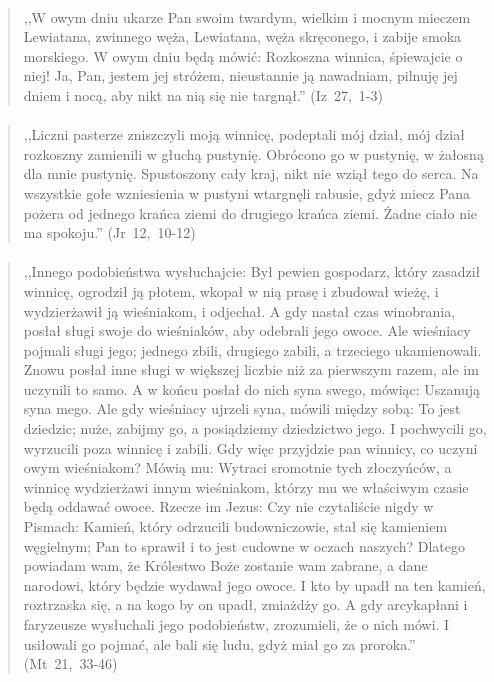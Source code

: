 \documentclass[10pt,a4paper,oneside]{article}
\begin{document}
\paragraph{}
\begin{quote}
,,W owym dniu ukarze Pan swoim twardym, wielkim i mocnym mieczem Lewiatana, zwinnego węża, Lewiatana, węża skręconego, i zabije smoka morskiego. W owym dniu będą mówić: Rozkoszna winnica, śpiewajcie o niej! Ja, Pan, jestem jej stróżem, nieustannie ją nawadniam, pilnuję jej dniem i nocą, aby nikt na nią się nie targnął.'' \mbox{(Iz 27, 1-3)}
\end{quote}
\paragraph{}
\begin{quote}
,,Liczni pasterze zniszczyli moją winnicę, podeptali mój dział, mój dział rozkoszny zamienili w głuchą pustynię. Obrócono go w pustynię, w żałosną dla mnie pustynię. Spustoszony cały kraj, nikt nie wziął tego do serca. Na wszystkie gołe wzniesienia w pustyni wtargnęli rabusie, gdyż miecz Pana pożera od jednego krańca ziemi do drugiego krańca ziemi. Żadne ciało nie ma spokoju.'' \mbox{(Jr 12, 10-12)}
\end{quote}
\paragraph{}
\begin{quote}
,,Innego podobieństwa wysłuchajcie: Był pewien gospodarz, który zasadził winnicę, ogrodził ją płotem, wkopał w nią prasę i zbudował wieżę, i wydzierżawił ją wieśniakom, i odjechał. A gdy nastał czas winobrania, posłał sługi swoje do wieśniaków, aby odebrali jego owoce. Ale wieśniacy pojmali sługi jego; jednego zbili, drugiego zabili, a trzeciego ukamienowali. Znowu posłał inne sługi w większej liczbie niż za pierwszym razem, ale im uczynili to samo. A w końcu posłał do nich syna swego, mówiąc: Uszanują syna mego. Ale gdy wieśniacy ujrzeli syna, mówili między sobą: To jest dziedzic; nuże, zabijmy go, a posiądziemy dziedzictwo jego. I pochwycili go, wyrzucili poza winnicę i zabili. Gdy więc przyjdzie pan winnicy, co uczyni owym wieśniakom? Mówią mu: Wytraci sromotnie tych złoczyńców, a winnicę wydzierżawi innym wieśniakom, którzy mu we właściwym czasie będą oddawać owoce. Rzecze im Jezus: Czy nie czytaliście nigdy w Pismach: Kamień, który odrzucili budowniczowie, stał się kamieniem węgielnym; Pan to sprawił i to jest cudowne w oczach naszych? Dlatego powiadam wam, że Królestwo Boże zostanie wam zabrane, a dane narodowi, który będzie wydawał jego owoce. I kto by upadł na ten kamień, roztrzaska się, a na kogo by on upadł, zmiażdży go. A gdy arcykapłani i faryzeusze wysłuchali jego podobieństw, zrozumieli, że o nich mówi. I usiłowali go pojmać, ale bali się ludu, gdyż miał go za proroka.'' \mbox{(Mt 21, 33-46)}
\end{quote}
\end{document}
